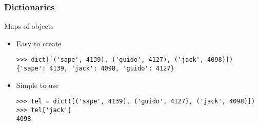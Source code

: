 \documentclass{beamer}
\begin{document}
\begin{frame}[fragile]
\frametitle{Dictionaries}
Maps of objects
\begin{itemize}
\item<2-> Easy to create \begin{verbatim}
>>> dict([('sape', 4139), ('guido', 4127), ('jack', 4098)])
{'sape': 4139, 'jack': 4098, 'guido': 4127}
\end{verbatim}
\item<3-> Simple to use \begin{verbatim}
>>> tel = dict([('sape', 4139), ('guido', 4127), ('jack', 4098)])
>>> tel['jack']
4098
\end{verbatim}
\end{itemize}
\end{frame}
\end{document}
